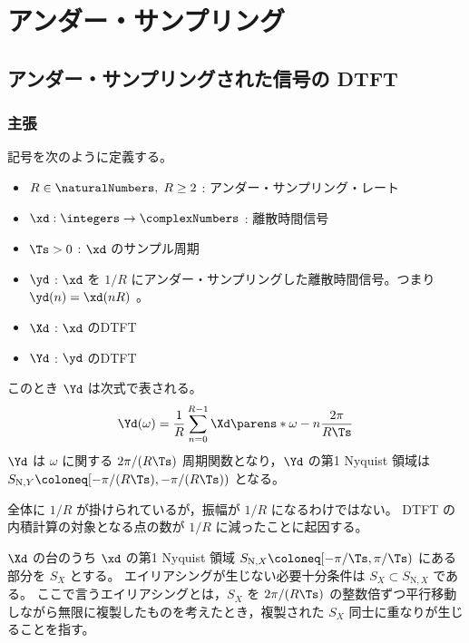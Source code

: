 \chapter{アンダー・サンプリング}
    \section{アンダー・サンプリングされた信号の DTFT}
        \label{アンダー・サンプリングされた信号の DTFT}
        \subsection{主張}
            記号を次のように定義する。
            \begin{itemize}
                \item $R\in\naturalNumbers,\;R\geq 2$ : アンダー・サンプリング・レート
                \item $\xd:\integers\to\complexNumbers$ : 離散時間信号
                \item $\Ts>0$ : $\xd$ のサンプル周期
                \item $\yd$ : $\xd$ を $1/R$ にアンダー・サンプリングした離散時間信号。つまり $\yd(n) = \xd(nR)$ 。
                \item $\Xd$ : $\xd$ のDTFT
                \item $\Yd$ : $\yd$ のDTFT
            \end{itemize}
            このとき $\Yd$ は次式で表される。
            \[ \Yd(\omega) = \frac{1}{R}\sum_{n=0}^{R-1} \Xd\parens*{\omega-n\frac{2\pi}{R\Ts}} \]
            $\Yd$ は $\omega$ に関する $2\pi/(R\Ts)$ 周期関数となり，$\Yd$ の第1 Nyquist 領域は $S_{\text{N},Y} \coloneq [-\pi/(R\Ts),-\pi/(R\Ts))$ となる。
            \par
            全体に $1/R$ が掛けられているが，振幅が $1/R$ になるわけではない。
            DTFT の内積計算の対象となる点の数が $1/R$ に減ったことに起因する。
            \par
            $\Xd$ の台のうち $\xd$ の第1 Nyquist 領域 $S_{\text{N},X} \coloneq [-\pi/\Ts, \pi/\Ts)$ にある部分を $S_X$ とする。
            エイリアシングが生じない必要十分条件は $S_X\subset S_{\text{N},X}$ である。
            ここで言うエイリアシングとは，$S_X$ を $2\pi/(R\Ts)$ の整数倍ずつ平行移動しながら無限に複製したものを考えたとき，複製された $S_X$ 同士に重なりが生じることを指す。
